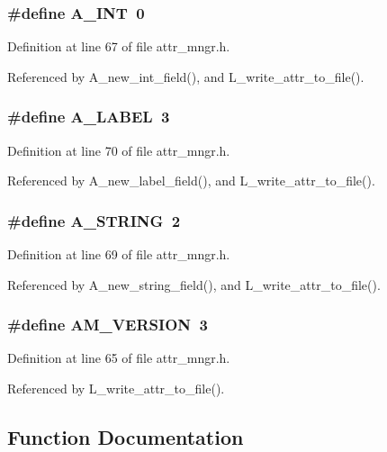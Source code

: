 \subsubsection{\setlength{\rightskip}{0pt plus 5cm}\#define A\_\-INT~0}\label{attr__mngr_8h_583ef0a9b22ce89bcf0df81228b424b5}




Definition at line 67 of file attr\_\-mngr.h.

Referenced by A\_\-new\_\-int\_\-field(), and L\_\-write\_\-attr\_\-to\_\-file().
\subsubsection{\setlength{\rightskip}{0pt plus 5cm}\#define A\_\-LABEL~3}\label{attr__mngr_8h_e74c4630d003eebd54e1a7b660b0ca3a}




Definition at line 70 of file attr\_\-mngr.h.

Referenced by A\_\-new\_\-label\_\-field(), and L\_\-write\_\-attr\_\-to\_\-file().
\subsubsection{\setlength{\rightskip}{0pt plus 5cm}\#define A\_\-STRING~2}\label{attr__mngr_8h_f1f0597f742de357fd94864c37ca4145}




Definition at line 69 of file attr\_\-mngr.h.

Referenced by A\_\-new\_\-string\_\-field(), and L\_\-write\_\-attr\_\-to\_\-file().
\subsubsection{\setlength{\rightskip}{0pt plus 5cm}\#define AM\_\-VERSION~3}\label{attr__mngr_8h_adcf87209450a145674b97e59e39ae3a}




Definition at line 65 of file attr\_\-mngr.h.

Referenced by L\_\-write\_\-attr\_\-to\_\-file().

\subsection{Function Documentation}
